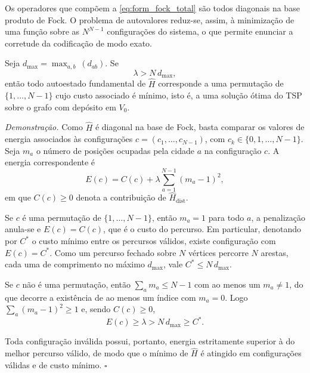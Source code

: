         Os operadores que compõem a \autoref{eq:form_fock_total} são todos diagonais na base produto de Fock. O problema de autovalores reduz-se, assim, à minimização de uma função sobre as $N^{N-1}$ configurações do sistema, o que permite enunciar a corretude da codificação de modo exato.

        \begin{prop}\label{prop:form_fock_corretude}
            Seja $d_{\max} = \max_{a,b}\ (d_{ab})$. Se
            \begin{equation}\label{eq:form_fock_lambda}
                \lambda > N \, d_{\max} ,
            \end{equation}
            \noindent então todo autoestado fundamental de $\hat{H}$ corresponde a uma permutação de $\{1, \dots, N-1\}$ cujo custo associado é mínimo, isto é, a uma solução ótima do TSP sobre o grafo com depósito em $V_0$.
        \end{prop}

        \noindent\textit{Demonstração.} Como $\hat{H}$ é diagonal na base de Fock, basta comparar os valores de energia associados às configurações $c = (c_1, \dots, c_{N-1})$, com $c_k \in \{0, 1, \dots, N-1\}$. Seja $m_a$ o número de posições ocupadas pela cidade $a$ na configuração $c$. A energia correspondente é
        \begin{equation*}
            E(c) = C(c) + \lambda \sum_{a=1}^{N-1} (m_a - 1)^2 ,
        \end{equation*}
        \noindent em que $C(c) \geq 0$ denota a contribuição de $\hat{H}_{\text{dist}}$.

        Se $c$ é uma permutação de $\{1, \dots, N-1\}$, então $m_a = 1$ para todo $a$, a penalização anula-se e $E(c) = C(c)$, que é o custo do percurso. Em particular, denotando por $C^\ast$ o custo mínimo entre os percursos válidos, existe configuração com $E(c) = C^\ast$. Como um percurso fechado sobre $N$ vértices percorre $N$ arestas, cada uma de comprimento no máximo $d_{\max}$, vale $C^\ast \leq N\, d_{\max}$.

        Se $c$ não é uma permutação, então $\sum_a m_a \leq N-1$ com ao menos um $m_a \neq 1$, do que decorre a existência de ao menos um índice com $m_a = 0$. Logo $\sum_a (m_a - 1)^2 \geq 1$ e, sendo $C(c) \geq 0$,
        \begin{equation*}
            E(c) \geq \lambda > N\, d_{\max} \geq C^\ast .
        \end{equation*}

        Toda configuração inválida possui, portanto, energia estritamente superior à do melhor percurso válido, de modo que o mínimo de $\hat{H}$ é atingido em configurações válidas e de custo mínimo. \hfill$\square$


